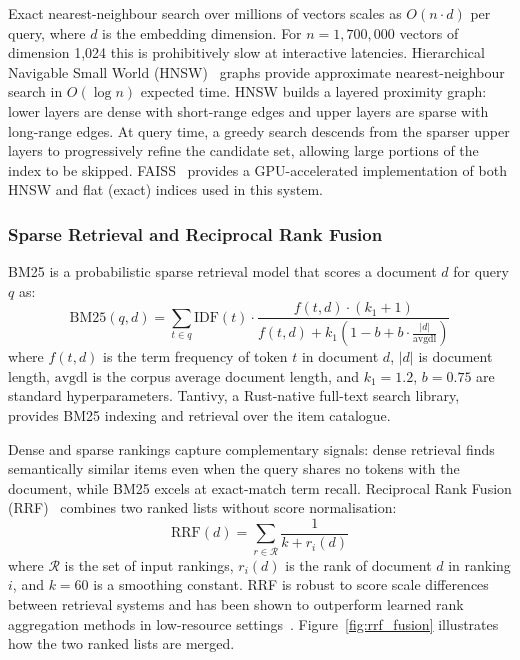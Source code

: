 Exact nearest-neighbour search over millions of vectors scales as $O(n \cdot d)$ per query, where $d$ is the embedding dimension.
For $n = 1{,}700{,}000$ vectors of dimension 1{,}024 this is prohibitively slow at interactive latencies.
Hierarchical Navigable Small World (HNSW)~\cite{malkov2018hnsw} graphs provide approximate nearest-neighbour search in $O(\log n)$ expected time.
HNSW builds a layered proximity graph: lower layers are dense with short-range edges and upper layers are sparse with long-range edges.
At query time, a greedy search descends from the sparser upper layers to progressively refine the candidate set, allowing large portions of the index to be skipped.
FAISS~\cite{johnson2021faiss} provides a GPU-accelerated implementation of both HNSW and flat (exact) indices used in this system.

\subsubsection{Sparse Retrieval and Reciprocal Rank Fusion}

BM25 is a probabilistic sparse retrieval model that scores a document $d$ for query $q$ as:
\begin{equation}
  \text{BM25}(q, d) = \sum_{t \in q} \text{IDF}(t) \cdot \frac{f(t, d) \cdot (k_1 + 1)}{f(t, d) + k_1 \left(1 - b + b \cdot \frac{|d|}{\text{avgdl}}\right)}
\end{equation}
where $f(t, d)$ is the term frequency of token $t$ in document $d$, $|d|$ is document length, $\text{avgdl}$ is the corpus average document length, and $k_1 = 1.2$, $b = 0.75$ are standard hyperparameters.
Tantivy, a Rust-native full-text search library, provides BM25 indexing and retrieval over the item catalogue.

Dense and sparse rankings capture complementary signals: dense retrieval finds semantically similar items even when the query shares no tokens with the document, while BM25 excels at exact-match term recall.
Reciprocal Rank Fusion (RRF)~\cite{cormack2009rrf} combines two ranked lists without score normalisation:
\begin{equation}
  \text{RRF}(d) = \sum_{r \in \mathcal{R}} \frac{1}{k + r_i(d)}
\end{equation}
where $\mathcal{R}$ is the set of input rankings, $r_i(d)$ is the rank of document $d$ in ranking $i$, and $k = 60$ is a smoothing constant.
RRF is robust to score scale differences between retrieval systems and has been shown to outperform learned rank aggregation methods in low-resource settings~\cite{cormack2009rrf}.
Figure~\ref{fig:rrf_fusion} illustrates how the two ranked lists are merged.

